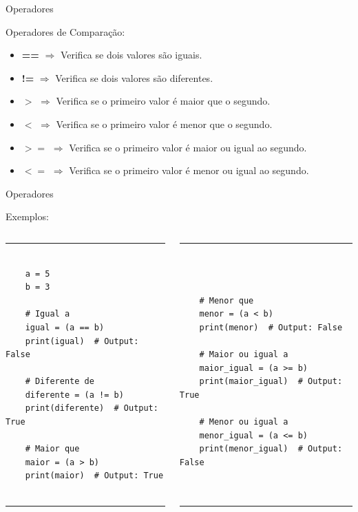 \documentclass{beamer}
\begin{document}
\begin{frame}[fragile]{Operadores}
	
	\label{operadores_comparacao}
	Operadores de Comparação:
	
	\begin{itemize}
    	\item \textbf{==} $\Rightarrow$ Verifica se dois valores são iguais.
		\item \textbf{!=} $\Rightarrow$ Verifica se dois valores são diferentes.
		\item \textbf{$>$} $\Rightarrow$ Verifica se o primeiro valor é maior que o segundo.
		\item \textbf{$<$} $\Rightarrow$ Verifica se o primeiro valor é menor que o segundo.
		\item \textbf{$>=$} $\Rightarrow$ Verifica se o primeiro valor é maior ou igual ao segundo.
		\item \textbf{$<=$} $\Rightarrow$ Verifica se o primeiro valor é menor ou igual ao segundo.
	\end{itemize}
	
\end{frame}


\begin{frame}[fragile]{Operadores}
	
	\label{operadores_comparacao_exemplos}
	Exemplos:
	
	\begin{columns}
		\begin{column}{0.5\textwidth}
			
			\rule{\textwidth}{1pt}
			\scriptsize
			\begin{verbatim}
				
	a = 5
	b = 3
	
	# Igual a
	igual = (a == b)
	print(igual)  # Output: False
	
	# Diferente de
	diferente = (a != b)
	print(diferente)  # Output: True
	
	# Maior que
	maior = (a > b)
	print(maior)  # Output: True
				
			\end{verbatim}
			\rule{\textwidth}{1pt}
		\end{column}
		\begin{column}{0.5\textwidth}
			
			\rule{\textwidth}{1pt}
			\scriptsize
			\begin{verbatim}
				
				
				
	# Menor que
	menor = (a < b)
	print(menor)  # Output: False
	
	# Maior ou igual a
	maior_igual = (a >= b)
	print(maior_igual)  # Output: True
	
	# Menor ou igual a
	menor_igual = (a <= b)
	print(menor_igual)  # Output: False
			
					
			\end{verbatim}
			
			\rule{\textwidth}{1pt}
		\end{column}
	\end{columns}
	
\end{frame}
\end{document}
